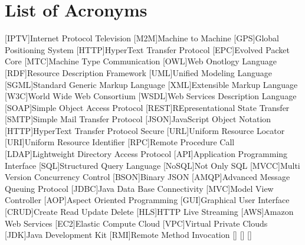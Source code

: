 \pagebreak
\section*{List of Acronyms}
\begin{acronym}
        [IPTV]{Internet Protocol Television}
        [M2M]{Machine to Machine}
        [GPS]{Global Positioning System}
        [HTTP]{HyperText Transfer Protocol}
        [EPC]{Evolved Packet Core}
        [MTC]{Machine Type Communication}
		[OWL]{Web Onotlogy Language}
		[RDF]{Resource Description Framework}
		[UML]{Unified Modeling Language}
		{Standard Generic Markup Language}
		[XML]{Extensible Markup Language}
		[W3C]{World Wide Web Consortium}
		{Web Services Description Language}
		{Simple Object Access Protocol}
		{REpresentational State Transfer}
		{Simple Mail Transfer Protocol}
		{JavaScript Object Notation}
		{HyperText Transfer Protocol Secure}
		[URL]{Uniform Resource Locator}
		[URI]{Uniform Resource Identifier}
		[RPC]{Remote Procedure Call}
		{Lightweight Directory Access Protocol}
		[API]{Application Programming Interface}
		[SQL]{Structured Query Language}
		[NoSQL]{Not Only SQL}
		{Multi Version Concurrency Control}
		{Binary JSON}
		{Advanced Message Queuing Protocol}
		{Java Data Base Connectivity}
		[MVC]{Model View Controller}
		[AOP]{Aspect Oriented Programming}
		[GUI]{Graphical User Interface}
		{Create Read Update Delete}
		[HLS]{HTTP Live Streaming}
		[AWS]{Amazon Web Services}
		[EC2]{Elastic Compute Cloud}
		[VPC]{Virtual Private Clouds}
		[JDK]{Java Development Kit}
		[RMI]{Remote Method Invocation}
		\acro{}[]{}
		\acro{}[]{}
		\acro{}[]{}
\end{acronym}
